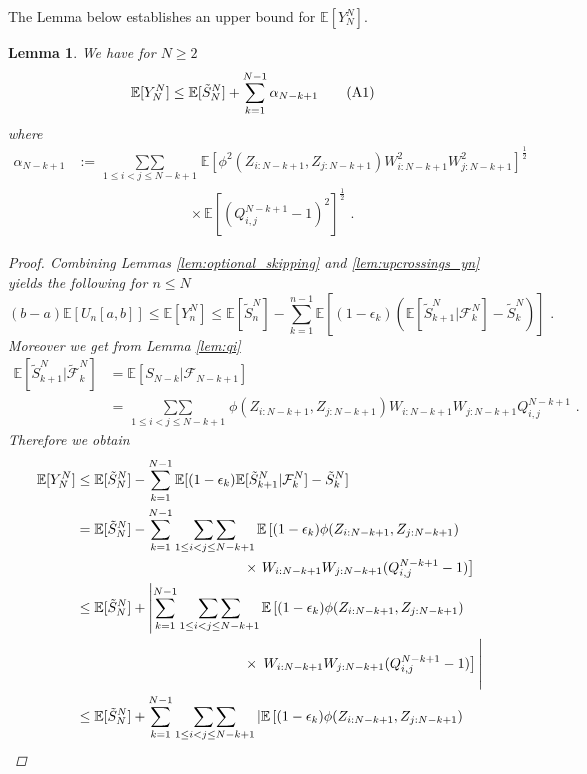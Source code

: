\documentclass[phd]{UWMThesis}
\newcommand\numberthis{\addtocounter{equation}{1}\tag{\theequation}}
\newcommand{\E}{\mathbb{E}}
\newcommand{\F}{\mathcal{F}}
\newcommand{\sn}[1]{S_{#1}}
\newcommand{\StN}[1]{\tilde{S}_{#1}^N}
\newcommand{\FtN}[1]{\tilde{\F}_{#1}^N}
\newcommand{\mdot}{\textrm{ .}}
\renewcommand{\.}{\textrm{ .}}
\newcommand{\doublesum}{\mathop{\sum\sum}}
\newtheorem{lemma}[thm]{Lemma}
\theoremstyle{definition}
\numberwithin{thm}{chapter}
\begin{document}
%
The Lemma below establishes an upper bound for $\E[Y_N^N]$. 
\begin{lemma} \label{lem:cs}
	We have for $N\geq 2$
	\begin{align*}
	\E[Y_N^N] &\leq \E[\StN{N}] + \sum_{k=1}^{N-1} \alpha_{N-k+1} \numberthis\label{eq:yn}
	\end{align*}
	where
	\begin{align*}
	\alpha_{N-k+1} &:= \doublesum\limits_{1\leq i<j\leq N-k+1}\E\left[\phi^2(Z_{i:N-k+1}, Z_{j:N-k+1}) W^2_{i:N-k+1} W^2_{j:N-k+1}\right]^{\frac{1}{2}}\\
	&\qquad\qquad\qquad\qquad \times \E\left[(Q_{i,j}^{N-k+1} - 1)^2\right]^{\frac{1}{2}}\mdot
	\end{align*}
	\begin{proof}
		Combining Lemmas \ref{lem:optional_skipping} and \ref{lem:upcrossings_yn} yields the following for $n\leq N$
		$$(b-a) \E[U_n[a,b]] \leq \E[Y_n^N] \leq \E[\StN{n}] - \sum_{k=1}^{n-1} \E[(1-\epsilon_k) \left(\E[\StN{k+1} | \F_k^N] - \StN{k}\right)]\mdot$$
		Moreover we get from Lemma \ref{lem:qi}
		\begin{align*}
		\E[\StN{k+1}|\FtN{k}] &= \E[\sn{N-k} | \F_{N-k+1}]\\
		&= \doublesum\limits_{1\leq i<j\leq N-k+1} \phi(Z_{i:N-k+1}, Z_{j:N-k+1}) W_{i:N-k+1} W_{j:N-k+1} Q_{i,j}^{N-k+1}\mdot
		\end{align*}
		Therefore we obtain
		\begin{align*}
		\E[Y_N^N] &\leq \E[\StN{N}] - \sum_{k=1}^{N-1} \E[(1-\epsilon_k) \E[\StN{k+1} | \F_k^N] - \StN{k} ]\\
		&=  \E[\StN{N}] - \sum_{k=1}^{N-1} \doublesum\limits_{1\leq i<j\leq N-k+1} \E\left[(1-\epsilon_k)\phi(Z_{i:N-k+1}, Z_{j:N-k+1}) \right. \\
		&\qquad\qquad\qquad\qquad\qquad\qquad \times \left. W_{i:N-k+1} W_{j:N-k+1}(Q_{i,j}^{N-k+1} - 1) \right]\\
		&\leq  \E[\StN{N}] + \left|\sum_{k=1}^{N-1} \doublesum\limits_{1\leq i<j\leq N-k+1} \E\left[(1-\epsilon_k)\phi(Z_{i:N-k+1}, Z_{j:N-k+1}) \right.\right. \\
		&\qquad\qquad\qquad\qquad\qquad\qquad \times \left.\left. W_{i:N-k+1} W_{j:N-k+1}(Q_{i,j}^{N-k+1} - 1) \right]\vphantom{\doublesum\limits_{1\leq i<j\leq N-k+1}}\right|\\
		&\leq  \E[\StN{N}] + \sum_{k=1}^{N-1} \doublesum\limits_{1\leq i<j\leq N-k+1} \left|\E\left[(1-\epsilon_k)\phi(Z_{i:N-k+1}, Z_{j:N-k+1}) \right.\right. \\

\end{align*}
\end{proof}
\end{lemma}
\end{document}
